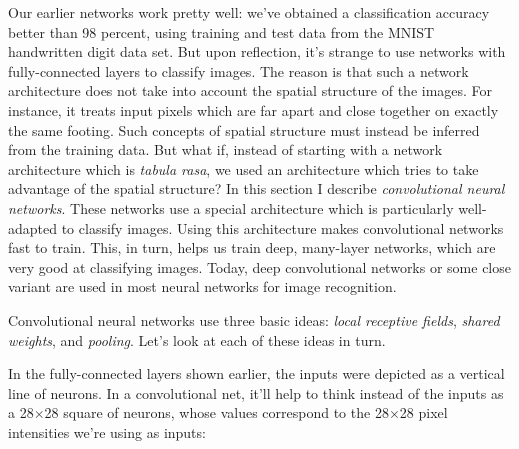 Our earlier networks work pretty well: we've obtained a classification accuracy better than 98 percent, using training and test data from the MNIST handwritten digit data set. But upon reflection, it's strange to use networks with fully-connected layers to classify images. The reason is that such a network architecture does not take into account the spatial structure of the images. For instance, it treats input pixels which are far apart and close together on exactly the same footing. Such concepts of spatial structure must instead be inferred from the training data. But what if, instead of starting with a network architecture which is \textit{tabula rasa}, we used an architecture which tries to take advantage of the spatial structure? In this section I describe \textit{convolutional neural networks}. These networks use a special architecture which is particularly well-adapted to classify images. Using this architecture makes convolutional networks fast to train. This, in turn, helps us train deep, many-layer networks, which are very good at classifying images. Today, deep convolutional networks or some close variant are used in most neural networks for image recognition.

Convolutional neural networks use three basic ideas: \textit{local receptive fields}, \textit{shared weights}, and \textit{pooling}. Let's look at each of these ideas in turn.

 In the fully-connected layers shown earlier, the inputs were depicted as a vertical line of neurons. In a convolutional net, it'll help to think instead of the inputs as a 28$\times$28 square of neurons, whose values correspond to the 28$\times$28 pixel intensities we're using as inputs:

